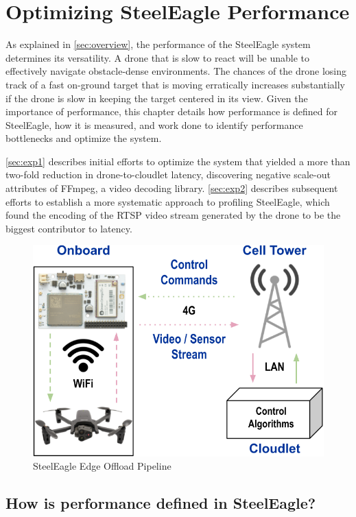 \chapter{Optimizing SteelEagle Performance}

As explained in \cref{sec:overview}, the performance of the SteelEagle system
determines its versatility. A drone that is slow to react will be unable to
effectively navigate obstacle-dense environments. The chances of the drone
losing track of a fast on-ground target that is moving erratically increases
substantially if the drone is slow in keeping the target centered in its view.
Given the importance of performance, this chapter details how performance is
defined for SteelEagle, how it is measured, and work done to identify
performance bottlenecks and optimize the system.

\cref{sec:exp1} describes initial efforts to optimize the system that yielded a
more than two-fold reduction in drone-to-cloudlet latency, discovering negative
scale-out attributes of FFmpeg, a video decoding library.  \cref{sec:exp2}
describes subsequent efforts to establish a more systematic approach to
profiling SteelEagle, which found the encoding of the RTSP video stream
generated by the drone to be the biggest contributor to latency.

\begin{figure}[htbp]
\centerline{\includegraphics[width = .5\textwidth]{figs/fig-simplified-arch.png}}
\caption{SteelEagle Edge Offload Pipeline}
\label{fig:simplified-arch}
\end{figure}

\section{How is performance defined in SteelEagle?}
\label{sec:steeleagle-performance-def}

